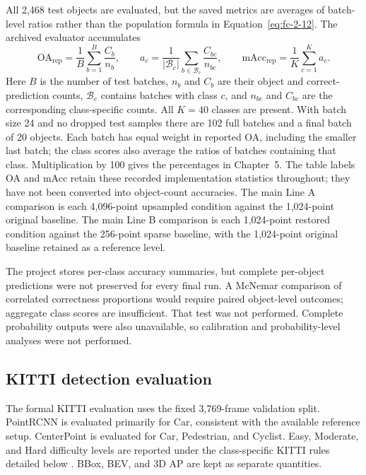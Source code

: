 All 2,468 test objects are evaluated, but the saved metrics are averages of
batch-level ratios rather than the population formula in
Equation~\eqref{eq:fc-2-12}. The archived evaluator accumulates
\begin{equation}
 \mathrm{OA}_{\mathrm{rep}}=\frac{1}{B}\sum_{b=1}^{B}\frac{C_b}{n_b},
 \qquad a_c=\frac{1}{|\mathcal B_c|}\sum_{b\in\mathcal B_c}
 \frac{C_{bc}}{n_{bc}},\qquad
 \mathrm{mAcc}_{\mathrm{rep}}=\frac{1}{K}\sum_{c=1}^{K}a_c.
 \label{eq:reported-classification}
\end{equation}
Here $B$ is the number of test batches, $n_b$ and $C_b$ are their object
and correct-prediction counts, $\mathcal B_c$ contains batches with class
$c$, and $n_{bc}$ and $C_{bc}$ are the corresponding class-specific
counts. All $K=40$ classes are present. With batch size 24 and no dropped
test samples there are 102 full batches and a final batch of 20 objects.
Each batch has equal weight in reported OA, including the smaller last
batch; the class scores also average the ratios of batches containing
that class. Multiplication by 100 gives the percentages in Chapter~5.
The table labels OA and mAcc retain these recorded implementation
statistics throughout; they have not been converted into object-count
accuracies. The main Line A comparison is each 4,096-point upsampled condition against the 1,024-point original baseline. The main Line B comparison is each 1,024-point restored condition against the 256-point sparse baseline, with the 1,024-point original baseline retained as a reference level.

The project stores per-class accuracy summaries, but complete per-object predictions were not preserved for every final run. A McNemar comparison of correlated correctness proportions \cite{mcnemar1947correlated} would require paired object-level outcomes; aggregate class scores are insufficient. That test was not performed. Complete probability outputs were also unavailable, so calibration and probability-level analyses were not performed.

\subsection{KITTI detection evaluation}
\label{sec:fc-4-10-3}

The formal KITTI evaluation uses the fixed 3,769-frame validation split. PointRCNN is evaluated primarily for Car, consistent with the available reference setup. CenterPoint is evaluated for Car, Pedestrian, and Cyclist. Easy, Moderate, and Hard difficulty levels are reported under the
class-specific KITTI rules detailed below \cite{kittieval2026}.
BBox, BEV, and 3D AP are kept as separate quantities.


